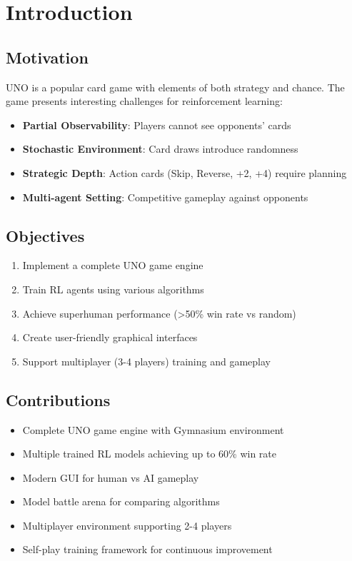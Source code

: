 \documentclass[12pt,a4paper]{article}
\begin{document}
\vspace*{\fill}       %
\newpage
\tableofcontents
\newpage
\section{Introduction}
\label{sec:introduction}
\subsection{Motivation}
UNO is a popular card game with elements of both strategy and chance. The game presents interesting challenges for reinforcement learning:
\begin{itemize}
    \item \textbf{Partial Observability}: Players cannot see opponents' cards
    \item \textbf{Stochastic Environment}: Card draws introduce randomness
    \item \textbf{Strategic Depth}: Action cards (Skip, Reverse, +2, +4) require planning
    \item \textbf{Multi-agent Setting}: Competitive gameplay against opponents
\end{itemize}
\subsection{Objectives}
\begin{enumerate}
    \item Implement a complete UNO game engine
    \item Train RL agents using various algorithms
    \item Achieve superhuman performance (>50\% win rate vs random)
    \item Create user-friendly graphical interfaces
    \item Support multiplayer (3-4 players) training and gameplay
\end{enumerate}
\subsection{Contributions}
\begin{itemize}
    \item Complete UNO game engine with Gymnasium environment
    \item Multiple trained RL models achieving up to 60\% win rate
    \item Modern GUI for human vs AI gameplay
    \item Model battle arena for comparing algorithms
    \item Multiplayer environment supporting 2-4 players
    \item Self-play training framework for continuous improvement
\end{itemize}
\newpage
\end{document}
